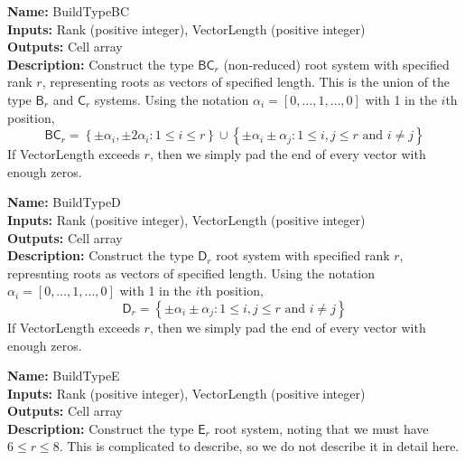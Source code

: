 \documentclass[12pt]{article}
\theoremstyle{definition}
\numberwithin{theorem}{subsection}
\newcommand{\lb}{\left\{}
\newcommand{\rb}{\right\}}
\newcommand{\tbf}{\textbf}
\newcommand{\noi}{\noindent}
\begin{document}
\begin{framed}
\noi \tbf{Name:} BuildTypeBC \\
\noi \tbf{Inputs:} Rank (positive integer), VectorLength (positive integer) \\
\noi \tbf{Outputs:} Cell array  \\
\noi \tbf{Description:} Construct the type $\mathsf{BC}_r$ (non-reduced) root system with specified rank $r$, representing roots as vectors of specified length. This is the union of the type $\mathsf{B}_r$ and $\mathsf{C}_r$ systems. Using the notation $\alpha_i = [0, \ldots, 1, \ldots, 0]$ with 1 in the $i$th position,
\[
	\mathsf{BC}_r = \lb \pm \alpha_i, \pm 2 \alpha_i : 1 \le i \le r \rb \cup \lb \pm \alpha_i \pm \alpha_j : 1 \le i, j \le r \text{ and } i \neq j \rb
\]
If VectorLength exceeds $r$, then we simply pad the end of every vector with enough zeros.
\end{framed}

\begin{framed}
\noi \tbf{Name:} BuildTypeD \\
\noi \tbf{Inputs:} Rank (positive integer), VectorLength (positive integer) \\
\noi \tbf{Outputs:} Cell array  \\
\noi \tbf{Description:} Construct the type $\mathsf{D}_r$ root system with specified rank $r$, represnting roots as vectors of specified length. Using the notation $\alpha_i = [0, \ldots, 1, \ldots, 0]$ with 1 in the $i$th position,
\[
	\mathsf{D}_r = \lb \pm \alpha_i \pm \alpha_j : 1 \le i, j \le r \text{ and } i \neq j \rb
\]
If VectorLength exceeds $r$, then we simply pad the end of every vector with enough zeros.
\end{framed}

\begin{framed}
\noi \tbf{Name:} BuildTypeE \\
\noi \tbf{Inputs:} Rank (positive integer), VectorLength (positive integer) \\
\noi \tbf{Outputs:} Cell array  \\
\noi \tbf{Description:} Construct the type $\mathsf{E}_r$ root system, noting that we must have $6 \le r \le 8$. This is complicated to describe, so we do not describe it in detail here.
\end{framed}
\end{document}
